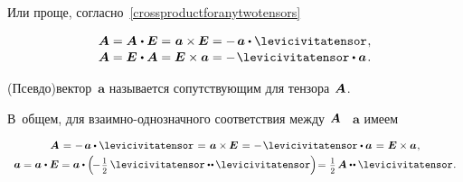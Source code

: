 Или проще, согласно~\eqref{crossproductforanytwotensors}

\nopagebreak\vspace{-0.1em}\begin{equation*}\begin{array}{c}
\bm{A} = \bm{A} \hspace{.1ex} \dotp \UnitDyad = \hspace{.1ex} \bm{a} \times \hspace{-0.1ex} \UnitDyad = - \hspace{.3ex} \bm{a} \dotp \levicivitatensor
\hspace{.1ex} ,
\\[.1em]
\bm{A} = \UnitDyad \hspace{.1ex} \dotp \bm{A} = \UnitDyad \times \bm{a} = - \hspace{.2ex} \levicivitatensor \dotp \bm{a}
\hspace{.2ex} .
\end{array}\end{equation*}

(Псевдо)вектор~$\bm{a}$ называется сопутствующим для тензора~${\hspace{-0.2ex}\bm{A}}$.

В~общем, для взаимно\hbox{-}однозначного соответствия между~${\hspace{-0.2ex}\bm{A}}$ ~$\bm{a}$ имеем

\nopagebreak\vspace{-0.25em}\begin{equation}\label{companionvector}
\begin{array}{c}
\bm{A} \hspace{.2ex} = \hspace{.1ex} - \hspace{.3ex} \bm{a} \dotp \levicivitatensor \hspace{.2ex} = \hspace{.2ex} \bm{a} \times\hspace{-0.1ex} \UnitDyad \hspace{.2ex} = \hspace{.1ex} - \hspace{.2ex} \levicivitatensor \dotp \bm{a} \hspace{.2ex} = \hspace{.1ex} \UnitDyad \times \bm{a}
\hspace{.1ex} ,
\\[.3em]
%
\bm{a} = \bm{a} \hspace{.1ex} \dotp \UnitDyad = \bm{a} \dotp \left( \hspace{-0.3ex} - \displaystyle \hspace{.2ex} \smalldisplaystyleonehalf \hspace{.4ex} \levicivitatensor \dotdotp \hspace{-0.1ex} \levicivitatensor \right) \hspace{-0.4ex} = \hspace{.1ex} \smalldisplaystyleonehalf \hspace{.32ex} \bm{A} \dotdotp \levicivitatensor
\hspace{.1ex} .
\end{array}
\end{equation}

